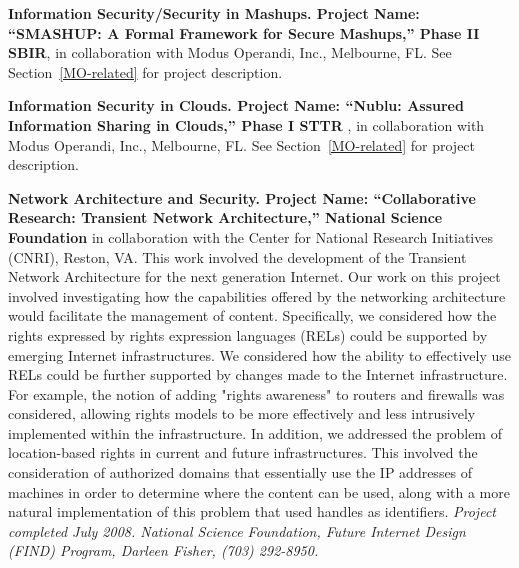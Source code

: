 \documentclass{sbir}
\begin{document}
{\bf Information Security/Security in Mashups. Project Name: ``SMASHUP: A Formal Framework for Secure Mashups,'' Phase II SBIR}, in collaboration with Modus Operandi, Inc., Melbourne, FL. See Section~\ref{MO-related} for project description.

{\bf Information Security in Clouds. Project Name: ``Nublu: Assured Information Sharing in Clouds,'' Phase I STTR} , in collaboration with Modus Operandi, Inc., Melbourne, FL. See Section~\ref{MO-related} for project description.

{\bf Network Architecture and Security. Project Name: ``Collaborative Research: Transient Network Architecture,'' National Science Foundation} in collaboration with the Center for National Research Initiatives (CNRI), Reston, VA. This work involved the development of the Transient Network Architecture for the next generation Internet. Our work on this project involved investigating how the capabilities offered by the networking architecture would facilitate the management of content. Specifically, we considered how the rights expressed by rights expression languages (RELs) could be supported by emerging Internet infrastructures. We considered how the ability to effectively use RELs could be further supported by changes made to the Internet infrastructure. For example, the notion of adding "rights awareness" to routers and firewalls was considered, allowing rights models to be more effectively and less intrusively implemented within the infrastructure. In addition, we addressed the problem of location-based rights in current and future infrastructures. This involved the consideration of authorized domains that essentially use the IP addresses of machines in order to determine where the content can be used, along with a more natural implementation of this problem that used handles as identifiers. \emph{Project completed July 2008. National Science Foundation, Future Internet Design (FIND) Program, Darleen Fisher, (703) 292-8950.}
\end{document}
